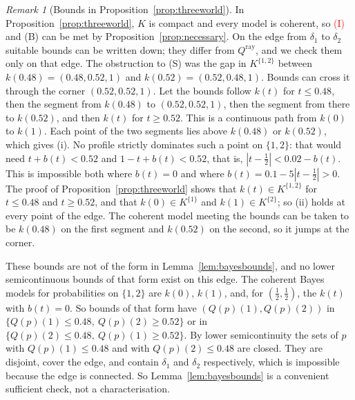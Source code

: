 \documentclass[11pt]{article}
\theoremstyle{definition}
\theoremstyle{remark}
\newtheorem{remark}[theorem]{Remark}
\begin{document}
\begin{remark}[Bounds in Proposition~\ref{prop:threeworld}]\label{rem:threeworld-bounds}
In Proposition~\ref{prop:threeworld}, $K$ is compact and every model is coherent, so \textcolor{red}{(I)} and (B) can be met by Proposition~\ref{prop:necessary}. On the edge from $\delta_1$ to $\delta_2$ suitable bounds can be written down; they differ from $Q^{\mathrm{ray}}$, and we check them only on that edge. The obstruction to (S) was the gap in $K^{\{1,2\}}$ between $k(0.48)=(0.48,0.52,1)$ and $k(0.52)=(0.52,0.48,1)$. Bounds can cross it through the corner $(0.52,0.52,1)$. Let the bounds follow $k(t)$ for $t\le0.48$, then the segment from $k(0.48)$ to $(0.52,0.52,1)$, then the segment from there to $k(0.52)$, and then $k(t)$ for $t\ge0.52$. This is a continuous path from $k(0)$ to $k(1)$. Each point of the two segments lies above $k(0.48)$ or $k(0.52)$, which gives (i). No profile strictly dominates such a point on $\{1,2\}$: that would need $t+b(t)<0.52$ and $1-t+b(t)<0.52$, that is, $|t-\tfrac12|<0.02-b(t)$. This is impossible both where $b(t)=0$ and where $b(t)=0.1-5|t-\tfrac12|>0$. The proof of Proposition~\ref{prop:threeworld} shows that $k(t)\in K^{\{1,2\}}$ for $t\le0.48$ and $t\ge0.52$, and that $k(0)\in K^{\{1\}}$ and $k(1)\in K^{\{2\}}$; so (ii) holds at every point of the edge. The coherent model meeting the bounds can be taken to be $k(0.48)$ on the first segment and $k(0.52)$ on the second, so it jumps at the corner.

These bounds are not of the form in Lemma~\ref{lem:bayesbounds}, and no lower semicontinuous bounds of that form exist on this edge. The coherent Bayes models for probabilities on $\{1,2\}$ are $k(0)$, $k(1)$, and, for $(\tfrac12,\tfrac12)$, the $k(t)$ with $b(t)=0$. So bounds of that form have $(Q(p)(1),Q(p)(2))$ in $\{Q(p)(1)\le0.48,\ Q(p)(2)\ge0.52\}$ or in $\{Q(p)(2)\le0.48,\ Q(p)(1)\ge0.52\}$. By lower semicontinuity the sets of $p$ with $Q(p)(1)\le0.48$ and with $Q(p)(2)\le0.48$ are closed. They are disjoint, cover the edge, and contain $\delta_1$ and $\delta_2$ respectively, which is impossible because the edge is connected. So Lemma~\ref{lem:bayesbounds} is a convenient sufficient check, not a characterisation.
\end{remark}
\end{document}

